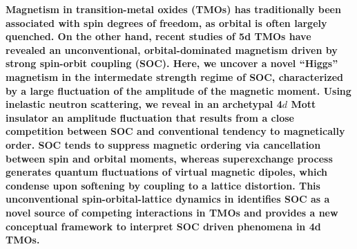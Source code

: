 \maketitle
\noindent
{\bf 
Magnetism in transition-metal oxides (TMOs) has traditionally been associated with spin degrees of freedom, as orbital is often largely quenched. On the other hand, recent studies of 5d TMOs have revealed an unconventional, orbital-dominated magnetism driven by strong spin-orbit coupling (SOC)\cite{Hwan_Chun_2015}. Here, we uncover a novel ``Higgs'' magnetism in the intermedate strength regime of SOC, characterized by a large fluctuation of the amplitude of the magnetic moment. Using inelastic neutron scattering, we reveal in an archetypal 4$d$ Mott insulator \CRO an amplitude fluctuation that results from a close competition between SOC and conventional tendency to magnetically order. SOC tends to suppress magnetic ordering via cancellation between spin and orbital moments, whereas superexchange process generates quantum fluctuations of virtual magnetic dipoles, which condense upon softening by coupling to a lattice distortion. This unconventional spin-orbital-lattice dynamics in \CRO identifies SOC as a novel source of competing interactions in TMOs and provides a new conceptual framework to interpret SOC driven phenomena in 4d TMOs.
}
  
  
  